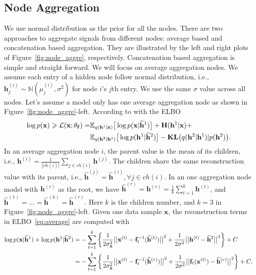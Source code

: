 \documentclass{article} %
\begin{document}
\subsection{Node Aggregation}

We use normal distribution as the prior for all the nodes. There are two approaches to aggregate signals from different nodes:  average based and concatenation based  aggregation. They are illustrated by the left and right plots of Figure~\ref{fig:node_aggre}, respectively. Concatenation based aggregation is simple and straight forward. We will focus on average aggregation nodes. We assume each entry of a hidden node follow normal distribution, i.e., $\mathbf{h}_j^{(i)} \sim \mathbb{N}(\mu_j^{(i)}, \sigma^2)$ for node $i$'s $j$th entry. We use the same $\sigma$ value across all nodes. Let's assume a model  only has one average aggregation node as shown in Figure~\ref{fig:node_aggre}-left. According to with the ELBO 
\begin{align} \notag
\log p(\mathbf{x})  \geqslant \mathcal{L}(\mathbf{x}; \theta_{\mathbf{f}})
=&\mathbb{E}_{q(\mathbf{h}^1 | \mathbf{x})} \big[\log p(\mathbf{x}|\widehat{\mathbf{h}}^1)\big] + \mathbf{H}(\mathbf{h}^1 | \mathbf{x}) + \\ \label{eq:average}
&\mathbb{E}_{q(\mathbf{h}^2 | \mathbf{h}^1)} \big[\log p(\mathbf{h}^1|\widehat{\mathbf{h}}^2)\big] - \textbf{\text{KL}}\big(q(\mathbf{h}^2 | \mathbf{h}^1) | p(\mathbf{h}^2)\big).
\end{align} 
In an average aggregation node $i$, the parent value is the mean of its children, i.e., $\mathbf{h}^{(i)} = \frac{1}{|ch(i)|} \sum_{j \in ch(i)} \mathbf{h}^{(j)}$. The  children  share the same reconstruction value with its parent, i.e., $\widehat{\mathbf{h}}^{(j)} = \widehat{\mathbf{h}}^{(i)}, \forall j \in ch(i)$. In an one aggregation node model with $\mathbf{h}^{(r)}$ as the root, we have  $\widehat{\mathbf{h}}^{(r)} = \mathbf{h}^{(r)} = \frac{1}{k}\sum_{t=1}^k \mathbf{h}^{(t)} $, and $ \widehat{\mathbf{h}}^{(1)} = ... = \widehat{\mathbf{h}}^{(k)}= \widehat{\mathbf{h}}^{(r)}$. Here $k$ is the children number, and $k=3$ in Figure~\ref{fig:node_aggre}-left. Given one data sample $\mathbf{x}$, the reconstruction terms in ELBO~\eqref{eq:average} are computed with 
\begin{align}\notag
\log p(\mathbf{x}|\widehat{\mathbf{h}}^1) + \log p(\mathbf{h}^1|\widehat{\mathbf{h}}^2)
=&-\sum_{t=1}^k\bigg\{ \frac{1}{2\sigma^2_{\mathbf{x}}}\big|\big| \mathbf{x}^{(t)} - \mathbf{f}_t^{-1}(\widehat{\mathbf{h}}^{(t)})\big|\big|^2 +  \frac{1}{2\sigma^2}\big|\big| \mathbf{h}^{(t)} -\widehat{\mathbf{h}}^2 \big|\big|^2 \bigg\} +C \\
=&-\sum_{t=1}^k\bigg\{ \frac{1}{2\sigma^2_{\mathbf{x}}}\big|\big| \mathbf{x}^{(t)} - \mathbf{f}_t^{-1}(\widehat{\mathbf{h}}^{(r)})\big|\big|^2 +  \frac{1}{2\sigma^2}\big|\big|  \mathbf{f}_t(\mathbf{x}^{(t)}) - \widehat{\mathbf{h}}^{(r)}\big|\big|^2 \bigg\} +C \label{eq:yllk} .
\end{align} 
\end{document}
